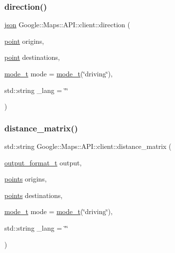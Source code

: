 \subsubsection{\texorpdfstring{direction()}{direction()}\hspace{0.1cm}{\footnotesize\ttfamily [2/2]}}
{\footnotesize\ttfamily \hyperlink{a00011_ab701e3ac61a85b337ec5c1abaad6742d}{json} Google\+::\+Maps\+::\+A\+P\+I\+::client\+::direction (\begin{DoxyParamCaption}\item[{\hyperlink{a00059}{point}}]{origins,  }\item[{\hyperlink{a00059}{point}}]{destinations,  }\item[{\hyperlink{a00051}{mode\+\_\+t}}]{mode = {\ttfamily \hyperlink{a00051}{mode\+\_\+t}(\char`\"{}driving\char`\"{})},  }\item[{std\+::string}]{\+\_\+lang = {\ttfamily \char`\"{}\char`\"{}} }\end{DoxyParamCaption})\hspace{0.3cm}{\ttfamily [inline]}}

\mbox{\label{a00047_a9f4b2db3de411d8f2b074ef7659d4558}} 
\subsubsection{\texorpdfstring{distance\+\_\+matrix()}{distance\_matrix()}\hspace{0.1cm}{\footnotesize\ttfamily [1/2]}}
{\footnotesize\ttfamily std\+::string Google\+::\+Maps\+::\+A\+P\+I\+::client\+::distance\+\_\+matrix (\begin{DoxyParamCaption}\item[{\hyperlink{a00055}{output\+\_\+format\+\_\+t}}]{output,  }\item[{\hyperlink{a00063}{points}}]{origins,  }\item[{\hyperlink{a00063}{points}}]{destinations,  }\item[{\hyperlink{a00051}{mode\+\_\+t}}]{mode = {\ttfamily \hyperlink{a00051}{mode\+\_\+t}(\char`\"{}driving\char`\"{})},  }\item[{std\+::string}]{\+\_\+lang = {\ttfamily \char`\"{}\char`\"{}} }\end{DoxyParamCaption})\hspace{0.3cm}{\ttfamily [inline]}}

